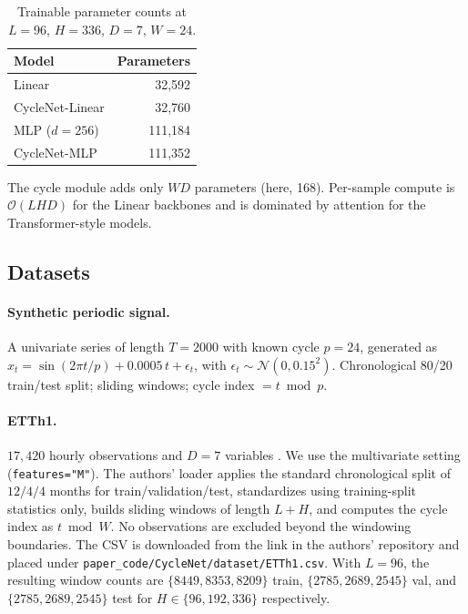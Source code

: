 \documentclass[10pt]{article}
\begin{document}
\begin{table}[h]
\centering
\caption{Trainable parameter counts at $L{=}96$, $H{=}336$, $D{=}7$, $W{=}24$.}
\label{tab:params}
\begin{tabular}{lr}
\toprule
Model & Parameters \\
\midrule
Linear           & 32{,}592 \\
CycleNet-Linear  & 32{,}760 \\
MLP ($d{=}256$)  & 111{,}184 \\
CycleNet-MLP     & 111{,}352 \\
\bottomrule
\end{tabular}
\end{table}

The cycle module adds only $WD$ parameters (here, 168). Per-sample compute is $\mathcal{O}(LH D)$ for the Linear backbones and is dominated by attention for the Transformer-style models.

\subsection{Datasets}

\paragraph{Synthetic periodic signal.}
A univariate series of length $T{=}2000$ with known cycle $p{=}24$, generated as
$x_t = \sin(2\pi t/p) + 0.0005\,t + \epsilon_t$, with $\epsilon_t \sim \mathcal{N}(0, 0.15^2)$. Chronological 80/20 train/test split; sliding windows; cycle index $=t \bmod p$.

\paragraph{ETTh1.}
$17{,}420$ hourly observations and $D{=}7$ variables \citep{lin2024cyclenet}. We use the multivariate setting (\texttt{features="M"}). The authors' loader applies the standard chronological split of $12/4/4$ months for train/validation/test, standardizes using training-split statistics only, builds sliding windows of length $L+H$, and computes the cycle index as $t \bmod W$. No observations are excluded beyond the windowing boundaries. The CSV is downloaded from the link in the authors' repository and placed under \texttt{paper\_code/CycleNet/dataset/ETTh1.csv}. With $L{=}96$, the resulting window counts are $\{8449,8353,8209\}$ train, $\{2785,2689,2545\}$ val, and $\{2785,2689,2545\}$ test for $H \in \{96,192,336\}$ respectively.
\end{document}
